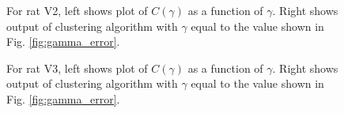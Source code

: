 \documentclass[superscriptaddress, twocolumn, prl]{revtex4}
\begin{document}
\begin{figure}[h]
\centering
{}
\caption{For rat V2, left shows plot of $C\left(\gamma \right)$ as a function of $\gamma$. Right shows output of clustering algorithm with $\gamma$ equal to the value shown in Fig. \ref{fig:gamma_error}.}
\end{figure}

\begin{figure}
\centering
{}
\caption{For rat V3, left shows plot of $C\left(\gamma \right)$ as a function of $\gamma$. Right shows output of clustering algorithm with $\gamma$ equal to the value shown in Fig. \ref{fig:gamma_error}.}
\end{figure}
\end{document}
